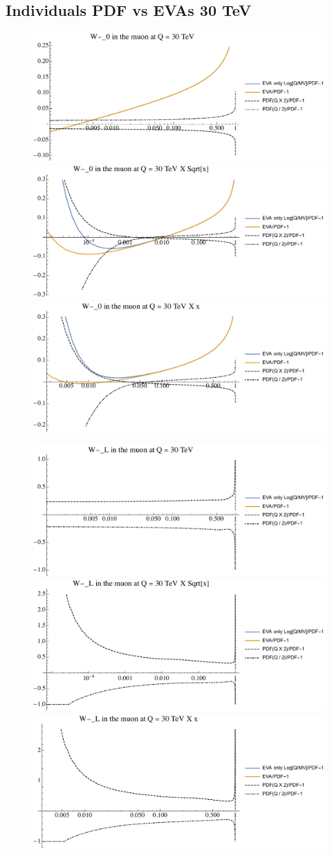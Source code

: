 \documentclass[a4paper,11pt]{article}
\begin{document}
\clearpage
\subsection{Individuals PDF vs EVAs 30 TeV}

\begin{figure}[ht]
\includegraphics[width=0.46\linewidth]{PlotPDFs/ratios/30TeV/W-_0_Q.pdf}
\includegraphics[width=0.46\linewidth]{PlotPDFs/ratios/30TeV/W-_0_Qsqrtx.pdf}
\includegraphics[width=0.46\linewidth]{PlotPDFs/ratios/30TeV/W-_0_Qx.pdf}
\end{figure}

\begin{figure}[ht]
\includegraphics[width=0.46\linewidth]{PlotPDFs/ratios/30TeV/W-_L_Q.pdf}
\includegraphics[width=0.46\linewidth]{PlotPDFs/ratios/30TeV/W-_L_Qsqrtx.pdf}
\includegraphics[width=0.46\linewidth]{PlotPDFs/ratios/30TeV/W-_L_Qx.pdf}
\end{figure}
\end{document}
